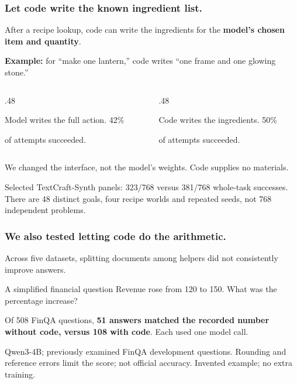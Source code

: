 \documentclass[aspectratio=169,12pt]{beamer}
\newcommand{\aside}[1]{\vfill{\footnotesize\color{Gray}#1\par}}
\begin{document}
\begin{frame}[t]
\frametitle{Let code write the known ingredient list.}
After a recipe lookup, code can write the ingredients for the \textbf{model's chosen item and quantity}.
\medskip

\textbf{Example:} for ``make one lantern,'' code writes ``one frame and one glowing stone.''
\vspace{1mm}
\begin{columns}[T,onlytextwidth]
\begin{column}{.48\textwidth}
\begin{block}{Model writes the full action.}
\centering\LARGE 42\%\par\normalsize of attempts succeeded.
\end{block}
\end{column}
\begin{column}{.48\textwidth}
\begin{block}{Code writes the ingredients.}
\centering\LARGE 50\%\par\normalsize of attempts succeeded.
\end{block}
\end{column}
\end{columns}
\medskip
We changed the interface, not the model's weights. Code supplies no materials.
\aside{Selected TextCraft-Synth panels: 323/768 versus 381/768 whole-task successes. There are 48 distinct goals, four recipe worlds and repeated seeds, not 768 independent problems.}
\end{frame}

\begin{frame}[t]
\frametitle{We also tested letting code do the arithmetic.}
Across five datasets, splitting documents among helpers did not consistently improve answers.
\begin{block}{A simplified financial question}
Revenue rose from 120 to 150. What was the percentage increase?
\end{block}
\begin{center}
\end{center}
Of 508 FinQA questions, \textbf{51 answers matched the recorded number without code, versus 108 with code}. Each used one model call.
\aside{Qwen3-4B; previously examined FinQA development questions. Rounding and reference errors limit the score; not official accuracy. Invented example; no extra training.}
\end{frame}
\end{document}
